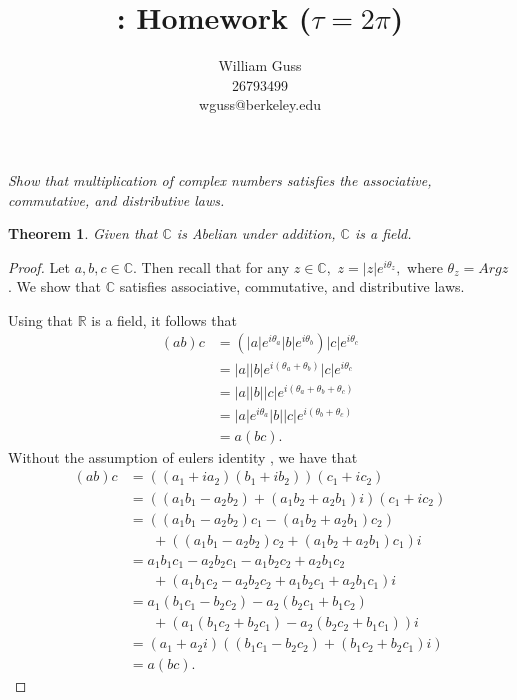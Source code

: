\documentclass[letter]{article}
\title{\bCLASS: Homework \bHWN ($\tau = 2\pi$)}
\author{William Guss\\26793499\\wguss@berkeley.edu}
\newtheorem{theorem}{Theorem}
\newenvironment{menumerate}{%
  \edef\backupindent{\the\parindent}%
  \enumerate%
  \setlength{\parindent}{\backupindent}%
}{\endenumerate}
\begin{document}
\maketitle
\thispagestyle{empty}


\begin{menumerate}
    \item \emph{Show that multiplication of complex numbers satisfies the associative,
commutative, and distributive laws.}
    \begin{theorem}
        Given that $\mathbb{C}$ is Abelian under addition, $\mathbb{C}$ is a field.
    \end{theorem}
    \begin{proof}
        Let $a,b,c \in \mathbb{C}.$ Then recall that for any $z \in \mathbb{C},$  
        $z = |z|e^{i\theta_z},$ where $\theta_z = Arg z$. We show that $\mathbb{C}$
        satisfies associative, commutative, and distributive laws.

        Using that $\mathbb{R}$ is a field, it follows that 
        \begin{equation*}
            \begin{aligned}
                (ab)c &= (|a|e^{i\theta_a}|b|e^{i\theta_b})|c|e^{i\theta_c} \\
                    &= |a||b|e^{i(\theta_a+\theta_b)}|c|e^{i\theta_c} \\ 
                    &= |a||b||c|e^{i(\theta_a+\theta_b +\theta_c)} \\
                    &= |a|e^{i\theta_a}|b||c|e^{i(\theta_b + \theta_c)} \\
                    &= a(bc).
            \end{aligned}
        \end{equation*}
        Without the assumption of eulers identity  , we have that
        \begin{equation*}
            \begin{aligned}
                (ab)c &= ((a_1+ia_2)(b_1 +ib_2))(c_1+ic_2) \\
                      &= ((a_1b_1 - a_2b_2) + (a_1b_2 + a_2b_1)i)(c_1+ic_2) \\
                      &= ((a_1b_1 - a_2b_2)c_1 - (a_1b_2 + a_2b_1)c_2) \\
                      &\;\;\;\;\;\;+ ((a_1b_1 - a_2b_2)c_2 + (a_1b_2 + a_2b_1)c_1)i \\
                      &= a_1b_1c_1 - a_2b_2c_1 - a_1b_2c_2 + a_2b_1c_2 \\
                      &\;\;\;\;\;\;+ (a_1b_1c_2 - a_2b_2c_2 + a_1b_2c_1 + a_2b_1c_1)i \\
                      &= a_1(b_1c_1 - b_2c_2) - a_2(b_2c_1  + b_1c_2) \\
                      &\;\;\;\;\;\;+ (a_1(b_1c_2 + b_2c_1) - a_2(b_2c_2 + b_1c_1))i \\
                      &=(a_1+a_2i)((b_1c_1 - b_2c_2) + (b_1c_2 + b_2c_1)i) \\
                      &= a(bc).
            \end{aligned}
        \end{equation*}


\end{proof}
\end{menumerate}
\end{document}
